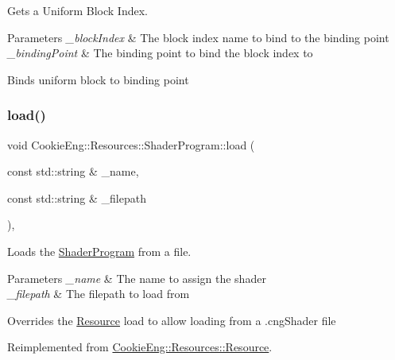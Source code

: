 Gets a Uniform Block Index. 


\begin{DoxyParams}{Parameters}
{\em \+\_\+block\+Index} & The block index name to bind to the binding point \\
\hline
{\em \+\_\+binding\+Point} & The binding point to bind the block index to\\
\hline
\end{DoxyParams}
Binds uniform block to binding point \mbox{\label{class_cookie_eng_1_1_resources_1_1_shader_program_aef29916bad667d1f820053fd891d9e58}} 
\subsubsection{\texorpdfstring{load()}{load()}}
{\footnotesize\ttfamily void Cookie\+Eng\+::\+Resources\+::\+Shader\+Program\+::load (\begin{DoxyParamCaption}\item[{const std\+::string \&}]{\+\_\+name,  }\item[{const std\+::string \&}]{\+\_\+filepath }\end{DoxyParamCaption})\hspace{0.3cm}{\ttfamily [override]}, {\ttfamily [virtual]}}



Loads the \hyperlink{class_cookie_eng_1_1_resources_1_1_shader_program}{Shader\+Program} from a file. 


\begin{DoxyParams}{Parameters}
{\em \+\_\+name} & The name to assign the shader \\
\hline
{\em \+\_\+filepath} & The filepath to load from\\
\hline
\end{DoxyParams}
Overrides the \hyperlink{class_cookie_eng_1_1_resources_1_1_resource}{Resource} load to allow loading from a .cng\+Shader file 

Reimplemented from \hyperlink{class_cookie_eng_1_1_resources_1_1_resource_a75648b8f2e442bebc90d6eb4ea3a2f6e}{Cookie\+Eng\+::\+Resources\+::\+Resource}.

\mbox{\label{class_cookie_eng_1_1_resources_1_1_shader_program_a6029828eaecc40f6a68779b86f5baf6d}} 
